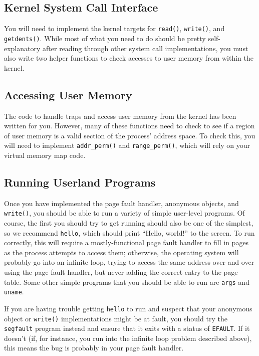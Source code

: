 \subsection{Kernel System Call Interface}

You will need to implement the kernel targets for \texttt{read()}, \texttt{write()}, and \texttt{getdents()}. While most of what you need to do should be pretty self-explanatory after reading through other system call implementations, you must also write two helper functions to check accesses to user memory from within the kernel.

\subsection{Accessing User Memory}

The code to handle traps and access user memory from the kernel has been written for you. However, many of these functions need to check to see if a region of user memory is a valid section of the process' address space. To check this, you will need to implement \texttt{addr\_perm()} and \texttt{range\_perm()}, which will rely on your virtual memory map code.

\subsection{Running Userland Programs}

Once you have implemented the page fault handler, anonymous objects, and \texttt{write()}, you should be able to run a variety of simple user-level programs. Of course, the first you should try to get running should also be one of the simplest, so we recommend \texttt{hello}, which should print ``Hello, world!'' to the screen. To run correctly, this will require a mostly-functional page fault handler to fill in pages as the process attempts to access them; otherwise, the operating system will probably go into an infinite loop, trying to access the same address over and over using the page fault handler, but never adding the correct entry to the page table. Some other simple programs that you should be able to run are \texttt{args} and \texttt{uname}.

If you are having trouble getting \texttt{hello} to run and suspect that your anonymous object or \texttt{write()} implementations might be at fault, you should try the \texttt{segfault} program instead and ensure that it exits with a status of \texttt{EFAULT}. If it doesn't (if, for instance, you run into the infinite loop problem described above), this means the bug is probably in your page fault handler.

